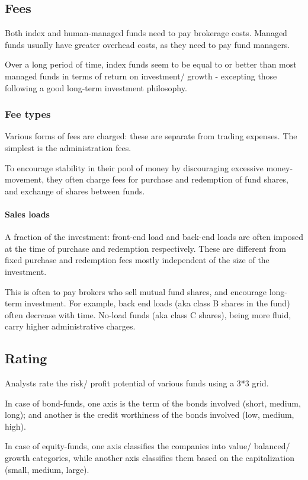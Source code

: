 \documentclass[oneside, article]{memoir}
\begin{document}
\subsection{Fees}
Both index and human-managed funds need to pay brokerage costs. Managed funds usually have greater overhead costs, as they need to pay fund managers.

Over a long period of time, index funds seem to be equal to or better than most managed funds in terms of return on investment/ growth - excepting those following a good long-term investment philosophy.

\subsubsection{Fee types}
Various forms of fees are charged: these are separate from trading expenses. The simplest is the administration fees.

To encourage stability in their pool of money by discouraging excessive money-movement, they often charge fees for purchase and redemption of fund shares, and exchange of shares between funds.

\paragraph{Sales loads}
A fraction of the investment: front-end load and back-end loads are often imposed at the time of purchase and redemption respectively. These are different from fixed purchase and redemption fees mostly independent of the size of the investment.

This is often to pay brokers who sell mutual fund shares, and encourage long-term investment. For example, back end loads (aka class B shares in the fund) often decrease with time. No-load funds (aka class C shares), being more fluid, carry higher administrative charges.

\subsection{Rating}
Analysts rate the risk/ profit potential of various funds using a 3*3 grid.

In case of bond-funds, one axis is the term of the bonds involved (short, medium, long); and another is the credit worthiness of the bonds involved (low, medium, high).

In case of equity-funds, one axis classifies the companies into value/ balanced/ growth categories, while another axis classifies them based on the capitalization (small, medium, large).
\end{document}
